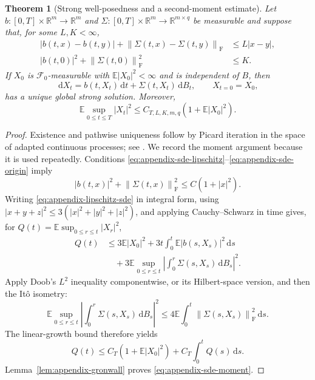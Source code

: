 \documentclass[11pt]{amsart}
\numberwithin{equation}{section}
\theoremstyle{plain}
\newtheorem{theorem}{Theorem}[section]
\newcommand{\R}{\mathbb{R}}
\newcommand{\E}{\mathbb{E}}
\newcommand{\dd}{\,\mathrm{d}}
\newcommand{\abs}[1]{\left\lvert#1\right\rvert}
\newcommand{\norm}[1]{\left\lVert#1\right\rVert}
\begin{document}
\begin{theorem}[Strong well-posedness and a second-moment estimate]
\label{thm:appendix-sde-wp}
Let
$b:[0,T]\times\R^m\to\R^m$ and
$\Sigma:[0,T]\times\R^m\to\R^{m\times q}$ be measurable and suppose that,
for some $L,K<\infty$,
\begin{align}
 \abs{b(t,x)-b(t,y)}
 +\norm{\Sigma(t,x)-\Sigma(t,y)}_{\mathrm F}
 &\leq L\abs{x-y},\label{eq:appendix-sde-lipschitz}\\
 \abs{b(t,0)}^2+\norm{\Sigma(t,0)}_{\mathrm F}^2
 &\leq K.\label{eq:appendix-sde-origin}
\end{align}
If $X_0$ is $\mathcal F_0$-measurable with $\E\abs{X_0}^2<\infty$ and is
independent of $B$, then
\begin{equation}\label{eq:appendix-lipschitz-sde}
 \dd X_t=b(t,X_t)\dd t+\Sigma(t,X_t)\dd B_t,
 \qquad X_{t=0}=X_0,
\end{equation}
has a unique global strong solution.  Moreover,
\begin{equation}\label{eq:appendix-sde-moment}
 \E\sup_{0\leq t\leq T}\abs{X_t}^2
 \leq C_{T,L,K,m,q}\left(1+\E\abs{X_0}^2\right).
\end{equation}
\end{theorem}
\begin{proof}
Existence and pathwise uniqueness follow by Picard iteration in the space of
adapted continuous processes; see
\cite[Chapter~5, Section~2]{KaratzasShreve1991}.  We record the moment argument
because it is used repeatedly.  Conditions
\eqref{eq:appendix-sde-lipschitz}--\eqref{eq:appendix-sde-origin} imply
\[
 \abs{b(t,x)}^2+\norm{\Sigma(t,x)}_{\mathrm F}^2
 \leq C(1+\abs{x}^2).
\]
Writing \eqref{eq:appendix-lipschitz-sde} in integral form, using
$\abs{x+y+z}^2\leq3(\abs{x}^2+\abs{y}^2+\abs{z}^2)$, and applying
Cauchy--Schwarz in time gives, for
$Q(t)=\E\sup_{0\leq r\leq t}\abs{X_r}^2$,
\begin{align*}
 Q(t)
 &\leq3\E\abs{X_0}^2
 +3t\int_0^t\E\abs{b(s,X_s)}^2\dd s\\
 &\quad+3\E\sup_{0\leq r\leq t}
 \left\lvert\int_0^r\Sigma(s,X_s)\dd B_s\right\rvert^2.
\end{align*}
Apply Doob's $L^2$ inequality componentwise, or its Hilbert-space version,
and then the It\^o isometry:
\[
 \E\sup_{0\leq r\leq t}
 \left\lvert\int_0^r\Sigma(s,X_s)\dd B_s\right\rvert^2
 \leq4\E\int_0^t\norm{\Sigma(s,X_s)}_{\mathrm F}^2\dd s.
\]
The linear-growth bound therefore yields
\[
 Q(t)\leq C_T\left(1+\E\abs{X_0}^2\right)
 +C_T\int_0^tQ(s)\dd s.
\]
Lemma~\ref{lem:appendix-gronwall} proves
\eqref{eq:appendix-sde-moment}.
\end{proof}
\end{document}
